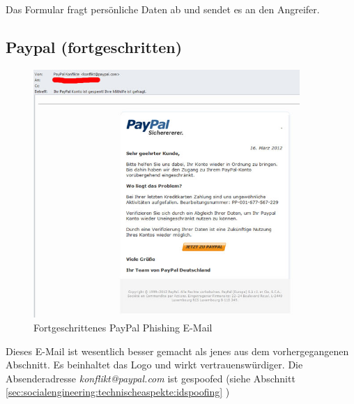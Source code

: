 Das Formular fragt persönliche Daten ab und sendet es an den Angreifer.

\subsection{Paypal (fortgeschritten)}
\begin{figure}[H]
  \centering
  \includegraphics[width=0.9\textwidth]{images/phishing-beispiel-paypal3.jpg}
  \caption{Fortgeschrittenes PayPal Phishing E-Mail}
  \label{fig:phishing:beispiele:paypalfortgeschrittenemail}
\end{figure}
Dieses E-Mail ist wesentlich besser gemacht als jenes aus dem vorhergegangenen Abschnitt. Es beinhaltet das Logo und wirkt vertrauenswürdiger. Die Absenderadresse \textit{konflikt@paypal.com} ist gespoofed (siehe Abschnitt \ref{sec:socialengineering:technischeaspekte:idspoofing} )

